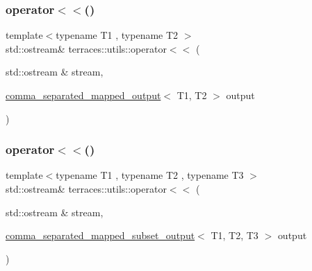 \mbox{\label{namespaceterraces_1_1utils_a00158c640c24f8fc9ceeaf63a1660d99}} 
\subsubsection{\texorpdfstring{operator$<$$<$()}{operator<<()}\hspace{0.1cm}{\footnotesize\ttfamily [2/3]}}
{\footnotesize\ttfamily template$<$typename T1 , typename T2 $>$ \\
std\+::ostream\& terraces\+::utils\+::operator$<$$<$ (\begin{DoxyParamCaption}\item[{std\+::ostream \&}]{stream,  }\item[{\hyperlink{structterraces_1_1utils_1_1comma__separated__mapped__output}{comma\+\_\+separated\+\_\+mapped\+\_\+output}$<$ T1, T2 $>$}]{output }\end{DoxyParamCaption})}

\mbox{\label{namespaceterraces_1_1utils_a4f2c8fedb5f9c911ac107e32c4bdb7e1}} 
\subsubsection{\texorpdfstring{operator$<$$<$()}{operator<<()}\hspace{0.1cm}{\footnotesize\ttfamily [3/3]}}
{\footnotesize\ttfamily template$<$typename T1 , typename T2 , typename T3 $>$ \\
std\+::ostream\& terraces\+::utils\+::operator$<$$<$ (\begin{DoxyParamCaption}\item[{std\+::ostream \&}]{stream,  }\item[{\hyperlink{structterraces_1_1utils_1_1comma__separated__mapped__subset__output}{comma\+\_\+separated\+\_\+mapped\+\_\+subset\+\_\+output}$<$ T1, T2, T3 $>$}]{output }\end{DoxyParamCaption})}

\mbox{\label{namespaceterraces_1_1utils_a7588b460cbed23936a666ce2c411e30b}} 
